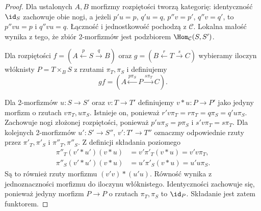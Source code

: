 \begin{proof}
Dla ustalonych $A,B$ morfizmy rozpiętości tworzą kategorię: identyczność $\id_S$ zachowuje obie nogi, a jeżeli $p'u=p$, $q'u=q$, $p''v=p'$, $q''v=q'$, to $p''vu=p$ i $q''vu=q$. Łączność i jednostkowość pochodzą z $\mathcal C$. Lokalna małość wynika z tego, że zbiór 2-morfizmów jest podzbiorem $\Hom_{\mathcal C}(S,S')$.

Dla rozpiętości $f=(A\xleftarrow{p}S\xrightarrow{q}B)$ oraz $g=(B\xleftarrow{r}T\xrightarrow{s}C)$ wybieramy iloczyn włóknisty $P=T\times_B S$ z rzutami $\pi_T,\pi_S$ i definiujemy
\[
 gf=(A\xleftarrow{p\pi_S}P\xrightarrow{s\pi_T}C).
\]
\begin{center}
\end{center}
Dla 2-morfizmów $u:S\to S'$ oraz $v:T\to T'$ definiujemy $v\ast u:P\to P'$ jako jedyny morfizm o rzutach $v\pi_T,u\pi_S$. Istnieje on, ponieważ $r'v\pi_T=r\pi_T=q\pi_S=q'u\pi_S$. Zachowuje nogi złożonej rozpiętości, ponieważ $p'u\pi_S=p\pi_S$ i $s'v\pi_T=s\pi_T$. Dla kolejnych 2-morfizmów $u':S'\to S''$, $v':T'\to T''$ oznaczmy odpowiednie rzuty przez $\pi'_T,\pi'_S$ i $\pi''_T,\pi''_S$. Z definicji składania poziomego
\[
\begin{aligned}
 \pi''_T(v'\ast u')(v\ast u)
 &=v'\pi'_T(v\ast u)=v'v\pi_T,\\
 \pi''_S(v'\ast u')(v\ast u)
 &=u'\pi'_S(v\ast u)=u'u\pi_S.
\end{aligned}
\]
Są to również rzuty morfizmu $(v'v)\ast(u'u)$. Równość wynika z jednoznaczności morfizmu do iloczynu włóknistego. Identyczności zachowuje się, ponieważ jedyny morfizm $P\to P$ o rzutach $\pi_T,\pi_S$ to $\id_P$. Składanie jest zatem funktorem.


\end{proof}
